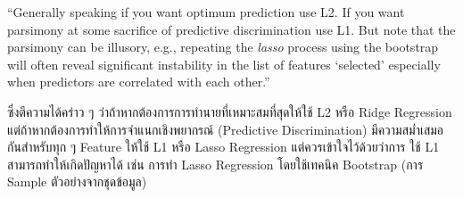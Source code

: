 \begin{framed}
    \enquote{Generally speaking if you want optimum prediction use L2. 
    If you want parsimony at some sacrifice of predictive discrimination use L1. 
    But note that the parsimony can be illusory, e.g., repeating the \textit{lasso} 
    process using the bootstrap will often reveal significant instability 
    in the list of features \enquote{selected} especially when predictors are 
    correlated with each other.}
\end{framed}

ซึ่งตีความได้คร่าว ๆ ว่าถ้าหากต้องการการทำนายที่เหมาะสมที่สุดให้ใช้ L2 หรือ Ridge Regression แต่ถ้าหากต้องการทำให้การจำแนกเชิงพยากรณ์
(Predictive Discrimination) มีความสม่ำเสมอกันสำหรับทุก ๆ Feature ให้ใช้ L1 หรือ Lasso Regression แต่ควรเข้าใจไว้ด้วยว่าการ%
ใช้ L1 สามารถทำให้เกิดปัญหาได้ เช่น การทำ Lasso Regression โดยใช้เทคนิค Bootstrap (การ Sample ตัวอย่างจากชุดข้อมูล)
